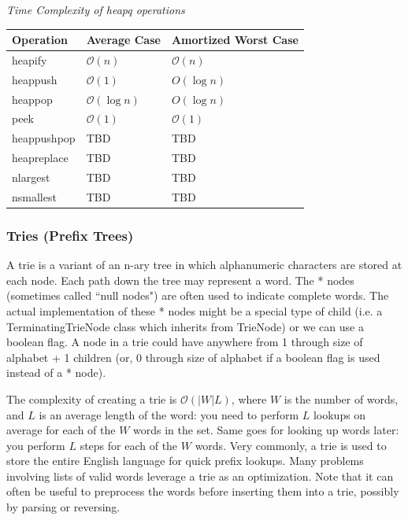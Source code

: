 \documentclass{article}
\newcommand{\bigO}{\mathcal{O}}
\begin{document}
\vspace{8pt} \emph{Time Complexity of heapq operations}
    \begin{table}[H]
        \begin{tabular}{|l|l|l|}
            \hline
            \textbf{Operation} & \textbf{Average Case} & \textbf{Amortized Worst Case} \\
            \hline
            heapify & $\bigO(n)$ & $\bigO(n)$ \\
            heappush & $\bigO(1)$ & $O(\log n)$ \\
            heappop & $\bigO(\log n)$ & $O(\log n)$ \\
            peek & $\bigO(1)$ & $\bigO(1)$\\
            heappushpop & TBD & TBD \\
            heapreplace & TBD & TBD \\
            nlargest & TBD & TBD \\
            nsmallest & TBD & TBD\\
            \hline
        \end{tabular}
    \end{table}


    \subsubsection{Tries (Prefix Trees)}
    A trie is a variant of an n-ary tree in which alphanumeric characters are stored at each node. Each path down the tree may represent a word. The * nodes (sometimes called ``null nodes") are often used to indicate complete words. The actual implementation of these * nodes might be a special type of child (i.e. a TerminatingTrieNode class which inherits from TrieNode) or we can use a boolean flag. A node in a trie could have anywhere from 1 through size of alphabet + 1 children (or, 0 through size of alphabet if a boolean flag is used instead of a * node). 
    
    The complexity of creating a trie is $\bigO(|W| L)$, where $W$ is the number of words, and $L$ is an average length of the word: you need to perform $L$ lookups on average for each of the $W$ words in the set. Same goes for looking up words later: you perform $L$ steps for each of the $W$ words. Very commonly, a trie is used to store the entire English language for quick prefix lookups. Many problems involving lists of valid words leverage a trie as an optimization. Note that it can often be useful to preprocess the words before inserting them into a trie, possibly by parsing or reversing.
    
\end{document}
